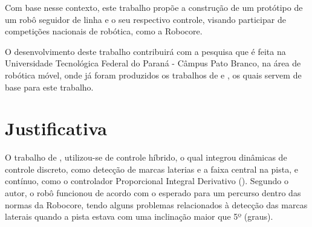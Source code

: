 \begin{comment}
Com base nesse contexto, este trabalho propõe o desenvolvimento de um protótipo de um robô seguidor de linha
e o seu respectivo controle, 
visando participar de competições nacionais de robótica, como a Robocore.
\end{comment}
Com base nesse contexto, este trabalho propõe a construção de um protótipo de um robô seguidor de linha
e o seu respectivo controle, 
visando participar de competições nacionais de robótica, como a Robocore.

\begin{comment}
Este trabalho visa contribuir com a 
pesquisa que é feita na Universidade Tecnológica Federal do Paraná 
- Câmpus Pato Branco, na área de robótica móvel, onde já foram produzidos 
os trabalhos de \citeonline{allan} e \citeonline{alemao}, os quais servem de base para este trabalho.
\end{comment}

O desenvolvimento deste trabalho contribuirá com a pesquisa que é feita na Universidade Tecnológica Federal do Paraná 
- Câmpus Pato Branco, na área de robótica móvel, onde já foram produzidos 
os trabalhos de  e , os quais servem de base para este trabalho.

\begin{spacing}{2}\end{spacing}
\section{Justificativa} \label{Justi}

O trabalho de , %
utilizou-se de controle híbrido, o qual 
integrou dinâmicas de controle discreto, como detecção de marcas laterias e a faixa central na pista, e contínuo, 
como o controlador Proporcional Integral Derivativo (). Segundo o autor, 
o robô funcionou de acordo com o esperado para um percurso dentro das normas da Robocore, 
tendo alguns problemas relacionados à detecção das marcas laterais quando a pista estava com uma inclinação 
maior que 5º (graus).

